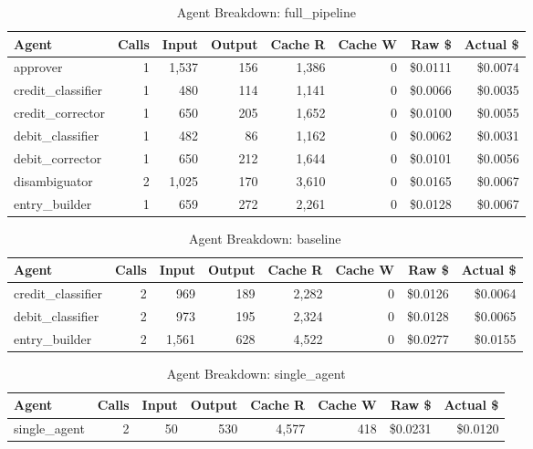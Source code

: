 \begin{table}[htbp]
\centering
\caption{Agent Breakdown: full\_pipeline}
\label{tab:agent-full-pipeline}
\begin{tabular}{l r rr rr rr}
\toprule
Agent & Calls & Input & Output & Cache R & Cache W & Raw \$ & Actual \$ \\
\midrule
  approver & 1 & 1,537 & 156 & 1,386 & 0 & \$0.0111 & \$0.0074 \\
  credit\_classifier & 1 & 480 & 114 & 1,141 & 0 & \$0.0066 & \$0.0035 \\
  credit\_corrector & 1 & 650 & 205 & 1,652 & 0 & \$0.0100 & \$0.0055 \\
  debit\_classifier & 1 & 482 & 86 & 1,162 & 0 & \$0.0062 & \$0.0031 \\
  debit\_corrector & 1 & 650 & 212 & 1,644 & 0 & \$0.0101 & \$0.0056 \\
  disambiguator & 2 & 1,025 & 170 & 3,610 & 0 & \$0.0165 & \$0.0067 \\
  entry\_builder & 1 & 659 & 272 & 2,261 & 0 & \$0.0128 & \$0.0067 \\
\bottomrule
\end{tabular}
\end{table}

\begin{table}[htbp]
\centering
\caption{Agent Breakdown: baseline}
\label{tab:agent-baseline}
\begin{tabular}{l r rr rr rr}
\toprule
Agent & Calls & Input & Output & Cache R & Cache W & Raw \$ & Actual \$ \\
\midrule
  credit\_classifier & 2 & 969 & 189 & 2,282 & 0 & \$0.0126 & \$0.0064 \\
  debit\_classifier & 2 & 973 & 195 & 2,324 & 0 & \$0.0128 & \$0.0065 \\
  entry\_builder & 2 & 1,561 & 628 & 4,522 & 0 & \$0.0277 & \$0.0155 \\
\bottomrule
\end{tabular}
\end{table}

\begin{table}[htbp]
\centering
\caption{Agent Breakdown: single\_agent}
\label{tab:agent-single-agent}
\begin{tabular}{l r rr rr rr}
\toprule
Agent & Calls & Input & Output & Cache R & Cache W & Raw \$ & Actual \$ \\
\midrule
  single\_agent & 2 & 50 & 530 & 4,577 & 418 & \$0.0231 & \$0.0120 \\
\bottomrule
\end{tabular}
\end{table}
